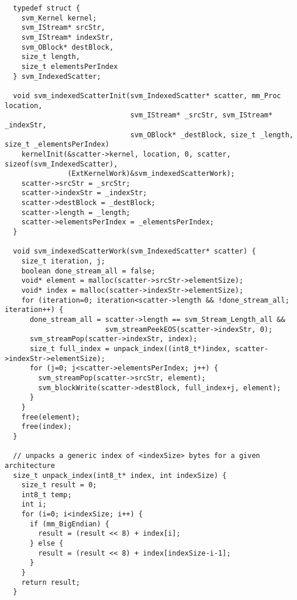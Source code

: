 \clearpage
\makeline
{}
{\small
\begin{verbatim}
  typedef struct {
    svm_Kernel kernel;
    svm_IStream* srcStr,
    svm_IStream* indexStr,
    svm_OBlock* destBlock,
    size_t length,
    size_t elementsPerIndex
  } svm_IndexedScatter;

  void svm_indexedScatterInit(svm_IndexedScatter* scatter, mm_Proc location, 
                              svm_IStream* _srcStr, svm_IStream* _indexStr, 
                              svm_OBlock* _destBlock, size_t _length, size_t _elementsPerIndex)
    kernelInit(&scatter->kernel, location, 0, scatter, sizeof(svm_IndexedScatter), 
               (ExtKernelWork)&svm_indexedScatterWork);
    scatter->srcStr = _srcStr;
    scatter->indexStr = _indexStr;
    scatter->destBlock = _destBlock;
    scatter->length = _length;
    scatter->elementsPerIndex = _elementsPerIndex;
  }

  void svm_indexedScatterWork(svm_IndexedScatter* scatter) {
    size_t iteration, j;
    boolean done_stream_all = false;
    void* element = malloc(scatter->srcStr->elementSize);
    void* index = malloc(scatter->indexStr->elementSize);
    for (iteration=0; iteration<scatter->length && !done_stream_all; iteration++) {
      done_stream_all = scatter->length == svm_Stream_Length_all && 
                        svm_streamPeekEOS(scatter->indexStr, 0);
      svm_streamPop(scatter->indexStr, index);
      size_t full_index = unpack_index((int8_t*)index, scatter->indexStr->elementSize);
      for (j=0; j<scatter->elementsPerIndex; j++) {
        svm_streamPop(scatter->srcStr, element);
        svm_blockWrite(scatter->destBlock, full_index+j, element);
      }
    }
    free(element);
    free(index);
  }

  // unpacks a generic index of <indexSize> bytes for a given architecture
  size_t unpack_index(int8_t* index, int indexSize) {
    size_t result = 0;
    int8_t temp;
    int i;
    for (i=0; i<indexSize; i++) {
      if (mm_BigEndian) {
        result = (result << 8) + index[i];
      } else {
        result = (result << 8) + index[indexSize-i-1];
      }
    }
    return result;
  }
\end{verbatim}}


